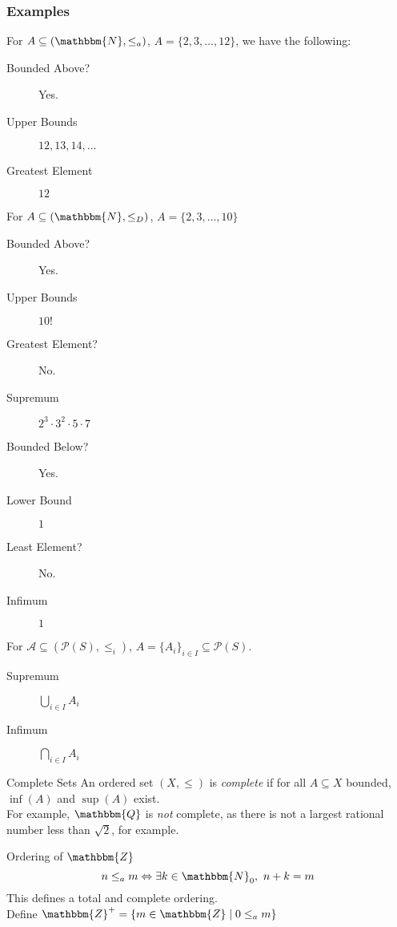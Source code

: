 \documentclass[10pt]{extarticle}
\newcommand{\N}{\mathbbm{N}}
\newcommand{\Q}{\mathbbm{Q}}
\newcommand{\Z}{\mathbbm{Z}}
\begin{document}
        \subsubsection{Examples}%
          For $A\subseteq (\N,\leq_a)$, $A = \{2,3,\dots,12\}$, we have the following:
          \begin{description}
            \item[Bounded Above?] Yes.
            \item[Upper Bounds] $12,13,14,\dots$
            \item[Greatest Element] $12$
          \end{description}
          For $A\subseteq (\N,\leq_D)$, $A = \{2,3,\dots,10\}$
          \begin{description}
            \item[Bounded Above?] Yes.
            \item[Upper Bounds] $10!$
            \item[Greatest Element?] No.
            \item[Supremum] $2^3\cdot3^2\cdot5\cdot7$
            \item[Bounded Below?] Yes.
            \item[Lower Bound] $1$
            \item[Least Element?] No.
            \item[Infimum] $1$
          \end{description}
          For $\mathcal{A}\subseteq (\mathcal{P}(S),\leq_i)$, $A = \{A_i\}_{i\in I} \subseteq \mathcal{P}(S)$.
          \begin{description}
            \item[Supremum] $\bigcup_{i\in I}A_i$
            \item[Infimum] $\bigcap_{i\in I}A_i$
          \end{description}
  \begin{problem}{Complete Sets}
    An ordered set $(X,\leq)$ is \textsl{complete} if for all $A\subseteq X$ bounded, $\inf(A)$ and $\sup(A)$ exist.\\

    For example, $\Q$ is \textsl{not} complete, as there is not a largest rational number less than $\sqrt{2}$, for example.
  \end{problem}
  \begin{problem}{Ordering of $\Z$}
    \[
      n\leq_a m \Leftrightarrow \exists k\in \N_0,~n+k=m
    \] 
    This defines a total and complete ordering.\\

    Define $\Z^+ = \{m\in \Z\mid 0\leq_a m\}$
  \end{problem}
\end{document}
